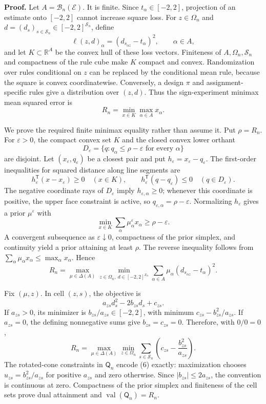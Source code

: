 \textbf{Proof.}
Let \(A=\mathcal B_n(\mathcal E)\). It is finite. Since \(t_\alpha\in[-2,2]\), projection of an estimate onto \([-2,2]\) cannot increase square loss. For \(z\in\Omega_n\) and \(d=(d_s)_{s\in\mathcal S_n}\in[-2,2]^{\mathcal S_n}\), define
\[
 \ell(z,d)_\alpha=(d_{s_{\alpha z}}-t_\alpha)^2,
 \qquad \alpha\in A,
\]
and let \(K\subset\mathbb R^A\) be the convex hull of these loss vectors. Finiteness of \(A,\Omega_n,\mathcal S_n\) and compactness of the rule cube make \(K\) compact and convex. Randomization over rules conditional on \(z\) can be replaced by the conditional mean rule, because the square is convex coordinatewise. Conversely, a design \(\pi\) and assignment-specific rules give a distribution over \((z,d)\). Thus the sign-experiment minimax mean squared error is
\[
 R_n=\min_{x\in K}\max_{\alpha\in A}x_\alpha. \tag{1}
\]

We prove the required finite minimax equality rather than assume it. Put \(\rho=R_n\). For \(\varepsilon>0\), the compact convex set \(K\) and the closed convex lower orthant
\[
 D_\varepsilon=\{q:q_\alpha\le\rho-\varepsilon\text{ for every }\alpha\}
\]
are disjoint. Let \((x_\varepsilon,q_\varepsilon)\) be a closest pair and put \(h_\varepsilon=x_\varepsilon-q_\varepsilon\). The first-order inequalities for squared distance along line segments are
\[
 h_\varepsilon^{\mathsf T}(x-x_\varepsilon)\ge0\quad(x\in K),
 \qquad
 h_\varepsilon^{\mathsf T}(q-q_\varepsilon)\le0\quad(q\in D_\varepsilon). \tag{2}
\]
The negative coordinate rays of \(D_\varepsilon\) imply \(h_{\varepsilon,\alpha}\ge0\); whenever this coordinate is positive, the upper face constraint is active, so \(q_{\varepsilon,\alpha}=\rho-\varepsilon\). Normalizing \(h_\varepsilon\) gives a prior \(\mu^\varepsilon\) with
\[
 \min_{x\in K}\sum_\alpha\mu^\varepsilon_\alpha x_\alpha
 \ge \rho-\varepsilon. \tag{3}
\]
A convergent subsequence as \(\varepsilon\downarrow0\), compactness of the prior simplex, and continuity yield a prior attaining at least \(\rho\). The reverse inequality follows from \(\sum_\alpha\mu_\alpha x_\alpha\le\max_\alpha x_\alpha\). Hence
\[
 R_n=\max_{\mu\in\Delta(A)}
 \min_{z\in\Omega_n,\ d\in[-2,2]^{\mathcal S_n}}
 \sum_{\alpha\in A}\mu_\alpha(d_{s_{\alpha z}}-t_\alpha)^2. \tag{4}
\]

Fix \((\mu,z)\). In cell \((z,s)\), the objective is
\[
 a_{zs}d_s^2-2b_{zs}d_s+c_{zs}. \tag{5}
\]
If \(a_{zs}>0\), its minimizer is \(b_{zs}/a_{zs}\in[-2,2]\), with minimum \(c_{zs}-b_{zs}^2/a_{zs}\). If \(a_{zs}=0\), the defining nonnegative sums give \(b_{zs}=c_{zs}=0\). Therefore, with \(0/0=0\),
\[
 R_n=\max_{\mu\in\Delta(A)}\min_{z\in\Omega_n}
 \sum_{s\in\mathcal S_n}
 \left(c_{zs}-\frac{b_{zs}^2}{a_{zs}}\right). \tag{6}
\]
The rotated-cone constraints in \(\mathsf Q_n\) encode (6) exactly: maximization chooses \(u_{zs}=b_{zs}^2/a_{zs}\) for positive \(a_{zs}\) and zero otherwise. Since \(|b_{zs}|\le2a_{zs}\), the convention is continuous at zero. Compactness of the prior simplex and finiteness of the cell sets prove dual attainment and \(\operatorname{val}(\mathsf Q_n)=R_n\).

